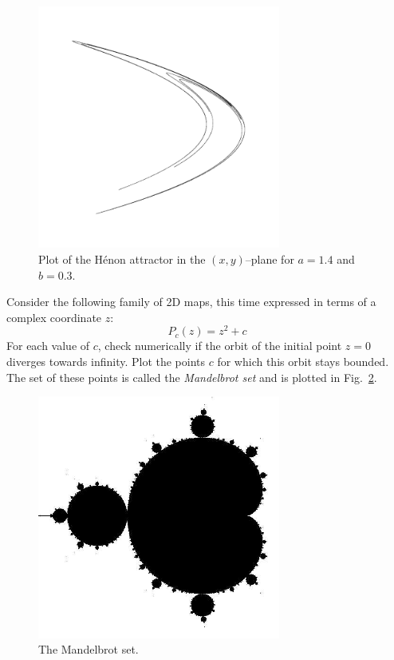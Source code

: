 \begin{figure}
\centering
\includegraphics[width=8cm]{dynamic/figures/henon_attractor}
\caption{Plot of the H\'{e}non attractor in the $(x,y)$--plane for $a=1.4$ and $b=0.3$.}
\label{fig-henon-attractor}
\end{figure} 

\begin{sidebar}
\begin{ex}
Consider the following family of 2D maps, this time expressed in terms of a complex coordinate $z$:
$$P_c(z)=z^2+c$$
For each value of $c$, check numerically if the orbit of the initial point $z=0$ diverges towards infinity. Plot the points $c$ for which this orbit stays bounded. The set of these points is called the \emph{Mandelbrot set} and is plotted in Fig.~\ref{fig-mandelbrot}.
\end{ex}
\end{sidebar}

\begin{figure}
\centering
\includegraphics[width=8cm]{dynamic/figures/mandelbrot}
\caption{The Mandelbrot set.}
\label{fig-mandelbrot}
\end{figure} 

